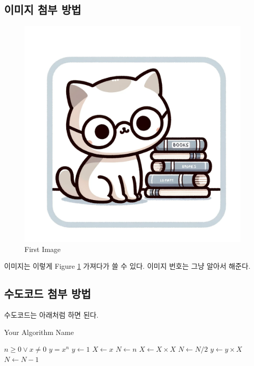 \documentclass[a4paper,11pt]{article}
\begin{document}
\subsection{이미지 첨부 방법}
\begin{figure}[h]
    \centering
    \includegraphics[width=0.75\linewidth]{figure/1.png}
    \caption{First Image}
    \label{fig:firstImage}
\end{figure}
이미지는 이렇게 Figure \ref{fig:firstImage} 가져다가 쓸 수 있다.
이미지 번호는 그냥 알아서 해준다.



\subsection{수도코드 첨부 방법}
수도코드는 아래처럼 하면 된다.

\begin{algorithm}
    \caption{Your Algorithm Name}
    \label{alg:your_algorithm}
    \begin{algorithmic}[1] %
        \REQUIRE $n \geq 0 \vee x \neq 0$ %
        \ENSURE $y = x^n$ %
        \STATE $y \leftarrow 1$
        \STATE $X \leftarrow x$
        \STATE $N \leftarrow n$
                \STATE $X \leftarrow X \times X$
                \STATE $N \leftarrow N / 2$ 
            \ELSE[$N$ is odd]
                \STATE $y \leftarrow y \times X$
                \STATE $N \leftarrow N - 1$
            \ENDIF
        \ENDWHILE
    \end{algorithmic}
\end{algorithm}
\end{document}
